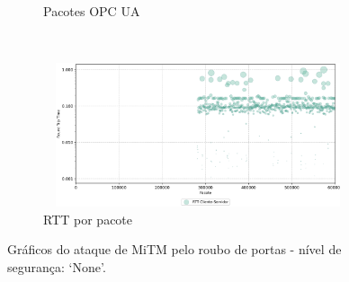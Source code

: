 \begin{apendicesenv}
\begin{figure}[htbp!]
\begin{subfigure}[t]{0.5\textwidth}
        \caption{Pacotes OPC UA}
    \end{subfigure}%
    ~
    \begin{subfigure}[t]{0.5\textwidth}
        \centering
        \includegraphics[width=1\textwidth, height=120pt]{USPSC-img/output/cropped/0-mitm_port-rttp.png}
        \caption{RTT por pacote}
    \end{subfigure}%
    \label{fig:0-mitm_port}
    \caption{Gráficos do ataque de MiTM pelo roubo de portas - nível de segurança: `None'.}
\end{figure}


\end{apendicesenv}
